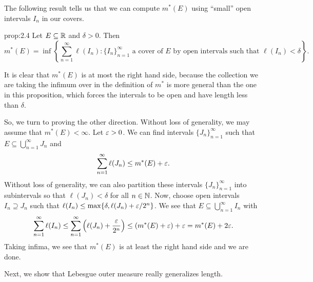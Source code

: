 The following result tells us that we can compute $m^*(E)$ using ``small''
open intervals $I_n$ in our covers. 

\begin{prop}{prop:2.4}
    Let $E \subseteq \mathbb{R}$ and $\delta > 0$. Then 
    \[ m^*(E) = \inf\left\{ \sum_{n=1}^\infty \ell(I_n) : 
    \{I_n\}_{n=1}^\infty \text{ a cover of $E$ by open intervals such that }
    \ell(I_n) < \delta \right\}. \] 
\end{prop}
\begin{pf}
    It is clear that $m^*(E)$ is at most the right hand side, because 
    the collection we are taking the infimum over in the definition of 
    $m^*$ is more general than the one in this proposition, which forces 
    the intervals to be open and have length less than $\delta$. 

    So, we turn to proving the other direction. Without loss of generality, 
    we may assume that $m^*(E) < \infty$. Let $\varepsilon > 0$. We can 
    find intervals $\{J_n\}_{n=1}^\infty$ such that $E \subseteq 
    \bigcup_{n=1}^\infty J_n$ and 
    \[ \sum_{n=1}^\infty \ell(J_n) \leq m^*(E) + \varepsilon. \] 
    Without loss of generality, we can also partition these intervals 
    $\{J_n\}_{n=1}^\infty$ into subintervals so that $\ell(J_n) < \delta$
    for all $n \in \mathbb{N}$. Now, choose open intervals $I_n \supseteq J_n$ 
    such that $\ell(I_n) \leq \max\{\delta, \ell(J_n) + \varepsilon/2^n\}$. 
    We see that $E \subseteq \bigcup_{n=1}^\infty I_n$ with 
    \[ \sum_{n=1}^\infty \ell(I_n) \leq \sum_{n=1}^\infty 
    \left( \ell(J_n) + \frac{\varepsilon}{2^n} \right) \leq (m^*(E) + \varepsilon) + \varepsilon 
    = m^*(E) + 2\varepsilon. \] 
    Taking infima, we see that $m^*(E)$ is at least the right hand side 
    and we are done. 
\end{pf}

Next, we show that Lebesgue outer measure really generalizes length. 

